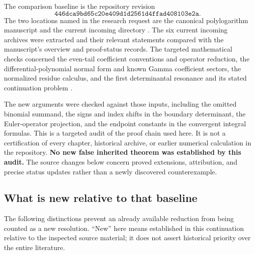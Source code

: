 \documentclass[11pt,letterpaper]{article}
\numberwithin{equation}{section}
\theoremstyle{plain}
\theoremstyle{definition}
\theoremstyle{remark}
\begin{document}
The comparison baseline is the repository revision
\[
 \texttt{446dca9bd65c20e409d1d2561d4ffad408103e2a}.
\]
The two locations named in the research request are the canonical
polylogarithm manuscript and the current incoming directory
\cite{Repo,Incoming}. The six current incoming archives were extracted
and their relevant statements compared with the manuscript's overview
and proof-status records. The targeted mathematical checks concerned
the even-tail coefficient conventions and operator reduction, the
differential-polynomial normal form and known Gamma coefficient sectors,
the normalized residue calculus, and the first determinantal resonance
and its stated continuation problem \cite{DPL,PTI,BTD,DHR}.

The new arguments were checked against those inputs, including the
omitted binomial summand, the signs and index shifts in the boundary
determinant, the Euler-operator projection, and the endpoint constants
in the convergent integral formulas. This is a targeted audit of the
proof chain used here. It is not a certification of every chapter,
historical archive, or earlier numerical calculation in the repository.
\textbf{No new false inherited theorem was established by this audit.}
The source changes below concern proved extensions, attribution, and
precise status updates rather than a newly discovered counterexample.

\subsection{What is new relative to that baseline}
\label{audit:status-matrix}

The following distinctions prevent an already available reduction from
being counted as a new resolution. ``New'' here means established in
this continuation relative to the inspected source material; it does
not assert historical priority over the entire literature.
\end{document}
